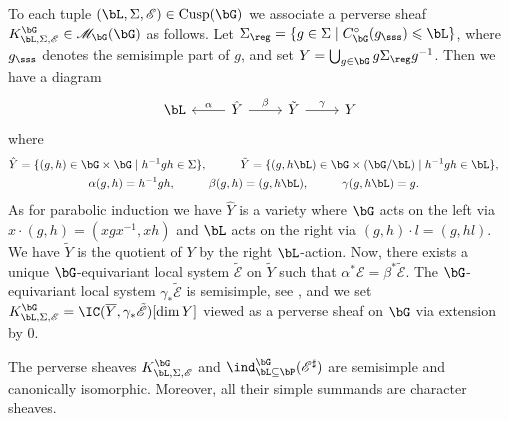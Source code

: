 \documentclass[eqthmnum,nocolour,skinny]{jt-calcs}
\DeclareMathOperator{\Cusp}{Cusp}
\begin{document}
\begin{pa}\label{pa:cuspidal-induce}
To each tuple $(\bL,\Sigma,\mathscr{E}) \in \Cusp(\bG)$ we associate a perverse sheaf $K_{\bL,\Sigma,\mathscr{E}}^{\bG} \in \mathscr{M}_{\bG}(\bG)$ as follows. Let $\Sigma_{\reg} = \{g \in \Sigma \mid C_{\bG}^{\circ}(g_{\sss}) \leqslant \bL \}$, where $g_{\sss}$ denotes the semisimple part of $g$, and set $Y = \bigcup_{g \in \bG} g\Sigma_{\reg}g^{-1}$. Then we have a diagram
\begin{equation*}
\begin{tikzcd}
\bL & \hat{Y} \arrow{l}[swap]{\alpha}\arrow{r}{\beta} & \tilde{Y} \arrow{r}{\gamma} & Y
\end{tikzcd}
\end{equation*}
where
\begin{gather*}
\begin{aligned}
\hat{Y} &= \{(g,h) \in \bG \times \bG \mid h^{-1}gh \in \Sigma\}, \quad&\quad \tilde{Y} &= \{(g,h\bL) \in \bG \times (\bG/\bL) \mid h^{-1}gh \in \bL\},
\end{aligned}\\
\begin{aligned}
\alpha(g,h) &= h^{-1}gh, \quad&\quad \beta(g,h) &= (g,h\bL), \quad&\quad \gamma(g,h\bL) &=g.
\end{aligned}
\end{gather*}
As for parabolic induction we have $\hat{Y}$ is a variety where $\bG$ acts on the left via $x\cdot(g,h) = (xgx^{-1},xh)$ and $\bL$ acts on the right via $(g,h)\cdot l = (g,hl)$. We have $\tilde{Y}$ is the quotient of $Y$ by the right $\bL$-action. Now, there exists a unique $\bG$-equivariant local system $\tilde{\mathscr{E}}$ on $\tilde{Y}$ such that $\alpha^*\mathscr{E} = \beta^*\tilde{\mathscr{E}}$. The $\bG$-equivariant local system $\gamma_*\tilde{\mathscr{E}}$ is semisimple, see \cite[Prop.~3.5]{lusztig:1984:intersection-cohomology-complexes}, and we set $K_{\bL,\Sigma,\mathscr{E}}^{\bG} = \IC(\overline{Y},\gamma_*\tilde{\mathscr{E}})[\dim Y]$ viewed as a perverse sheaf on $\bG$ via extension by $0$.
\end{pa}

\begin{thm}\label{thm:Lusztig-iso}
The perverse sheaves $K_{\bL,\Sigma,\mathscr{E}}^{\bG}$ and $\ind_{\bL\subseteq\bP}^{\bG}(\mathscr{E}^{\sharp})$ are semisimple and canonically isomorphic. Moreover, all their simple summands are character sheaves.
\end{thm}
\end{document}
